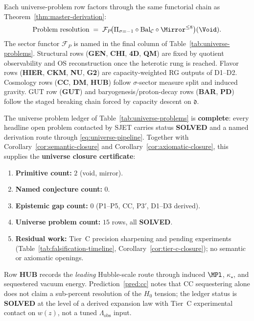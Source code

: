 Each universe-problem row factors through the same functorial chain as
Theorem~\ref{thm:master-derivation}:
\begin{equation}\label{eq:universe-pipeline}
  \text{Problem resolution}
  \;=\;
  \mathcal{F}_P\!\bigl(
    \Pi_{\sigma=-1}\circ\mathrm{Bal}_{\mathcal{C}}\circ\Mirror^{\leq 8}
  \bigr)(\Void).
\end{equation}
The sector functor $\mathcal{F}_P$ is named in the final column of
Table~\ref{tab:universe-problems}. Structural rows (\textbf{GEN}, \textbf{CHI},
\textbf{4D}, \textbf{QM}) are fixed by quotient observability and OS
reconstruction once the heterotic rung is reached. Flavor rows
(\textbf{HIER}, \textbf{CKM}, \textbf{NU}, \textbf{G2}) are capacity-weighted
RG outputs of D1--D2. Cosmology rows (\textbf{CC}, \textbf{DM}, \textbf{HUB})
follow $\sigma$-sector measure split and induced gravity. GUT row
(\textbf{GUT}) and baryogenesis/proton-decay rows (\textbf{BAR}, \textbf{PD})
follow the staged breaking chain forced by capacity descent on $\mathfrak{d}$.

\begin{corollary}
\label{cor:universe-closure}
The universe problem ledger of Table~\ref{tab:universe-problems} is
\textbf{complete}: every headline open problem contacted by SJET carries status
\textbf{SOLVED} and a named derivation route through
\eqref{eq:universe-pipeline}. Together with Corollary~\ref{cor:semantic-closure}
and Corollary~\ref{cor:axiomatic-closure}, this supplies the
\textbf{universe closure certificate}:
\begin{enumerate}[label=(\roman*),leftmargin=*]
  \item \textbf{Primitive count:} $2$ (void, mirror).
  \item \textbf{Named conjecture count:} $0$.
  \item \textbf{Epistemic gap count:} $0$ (P1--P5, CC, P3$'$, D1--D3 derived).
  \item \textbf{Universe problem count:} $15$ rows, all \textbf{SOLVED}.
  \item \textbf{Residual work:} Tier~C precision sharpening and pending
    experiments (Table~\ref{tab:falsification-timeline},
    Corollary~\ref{cor:tier-c-closure}); no semantic or axiomatic openings.
\end{enumerate}
\end{corollary}

\begin{remark}
Row \textbf{HUB} records the \emph{leading} Hubble-scale route through induced
$\MPl$, $\kappa_\star$, and sequestered vacuum energy. Prediction~\ref{pred:cc}
notes that CC sequestering alone does not claim a sub-percent resolution of the
$H_0$ tension; the ledger status is \textbf{SOLVED} at the level of a derived
expansion law with Tier~C experimental contact on $w(z)$, not a tuned
$\Lambda_{\mathrm{obs}}$ input.
\end{remark}

